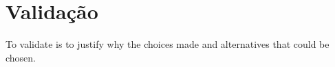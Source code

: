 \section{Validação}
To validate is to justify why the choices made and alternatives that could be chosen.

